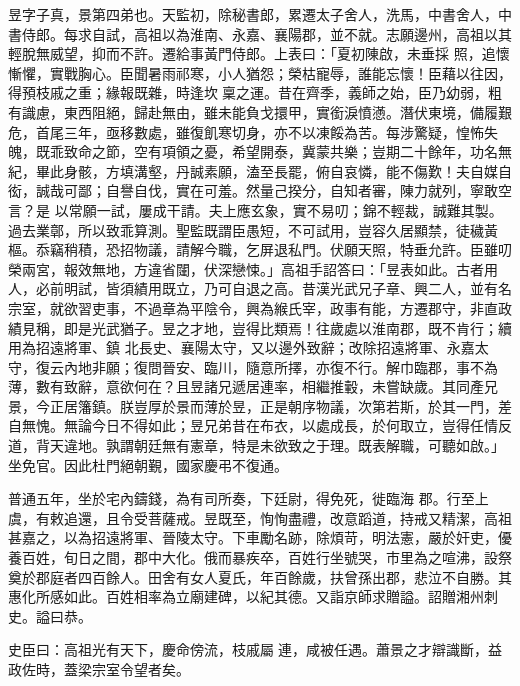 \begin{pinyinscope}
 昱字子真，景第四弟也。天監初，除秘書郎，累遷太子舍人，洗馬，中書舍人，中書侍郎。每求自試，高祖以為淮南、永嘉、襄陽郡，並不就。志願邊州，高祖以其輕脫無威望，抑而不許。遷給事黃門侍郎。上表曰：「夏初陳啟，未垂採
 照，追懷慚懼，實戰胸心。臣聞暑雨祁寒，小人猶怨；榮枯寵辱，誰能忘懷！臣藉以往因，得預枝戚之重；緣報既雜，時逢坎稟之運。昔在齊季，義師之始，臣乃幼弱，粗有識慮，東西阻絕，歸赴無由，雖未能負戈擐甲，實銜淚憤懣。潛伏東境，備履艱危，首尾三年，亟移數處，雖復飢寒切身，亦不以凍餒為苦。每涉驚疑，惶怖失魄，既乖致命之節，空有項領之憂，希望開泰，冀蒙共樂；豈期二十餘年，功名無紀，畢此身骸，方填溝壑，丹誠素願，溘至長罷，俯自哀憐，能不傷歎！夫自媒自衒，誠哉可鄙；自譽自伐，實在可羞。然量己揆分，自知者審，陳力就列，寧敢空言？是
 以常願一試，屢成干請。夫上應玄象，實不易叨；錦不輕裁，誠難其製。過去業鄣，所以致乖算測。聖監既謂臣愚短，不可試用，豈容久居顯禁，徒穢黃樞。忝竊稍積，恐招物議，請解今職，乞屏退私門。伏願天照，特垂允許。臣雖叨榮兩宮，報效無地，方違省闥，伏深戀悚。」高祖手詔答曰：「昱表如此。古者用人，必前明試，皆須績用既立，乃可自退之高。昔漢光武兄子章、興二人，並有名宗室，就欲習吏事，不過章為平陰令，興為緱氏宰，政事有能，方遷郡守，非直政績見稱，即是光武猶子。昱之才地，豈得比類焉！往歲處以淮南郡，既不肯行；續用為招遠將軍、鎮
 北長史、襄陽太守，又以邊外致辭；改除招遠將軍、永嘉太守，復云內地非願；復問晉安、臨川，隨意所擇，亦復不行。解巾臨郡，事不為薄，數有致辭，意欲何在？且昱諸兄遞居連率，相繼推轂，未嘗缺歲。其同產兄景，今正居籓鎮。朕豈厚於景而薄於昱，正是朝序物議，次第若斯，於其一門，差自無愧。無論今日不得如此；昱兄弟昔在布衣，以處成長，於何取立，豈得任情反道，背天違地。孰謂朝廷無有憲章，特是未欲致之于理。既表解職，可聽如啟。」坐免官。因此杜門絕朝覲，國家慶弔不復通。



 普通五年，坐於宅內鑄錢，為有司所奏，下廷尉，得免死，徙臨海
 郡。行至上虞，有敕追還，且令受菩薩戒。昱既至，恂恂盡禮，改意蹈道，持戒又精潔，高祖甚嘉之，以為招遠將軍、晉陵太守。下車勵名跡，除煩苛，明法憲，嚴於奸吏，優養百姓，旬日之間，郡中大化。俄而暴疾卒，百姓行坐號哭，市里為之喧沸，設祭奠於郡庭者四百餘人。田舍有女人夏氏，年百餘歲，扶曾孫出郡，悲泣不自勝。其惠化所感如此。百姓相率為立廟建碑，以紀其德。又詣京師求贈謚。詔贈湘州刺史。謚曰恭。



 史臣曰：高祖光有天下，慶命傍流，枝戚屬連，咸被任遇。蕭景之才辯識斷，益政佐時，蓋梁宗室令望者矣。



\end{pinyinscope}